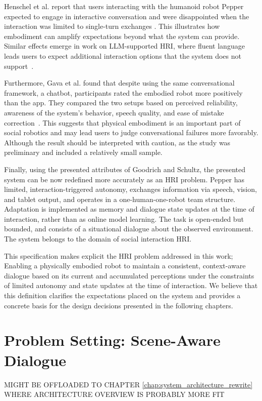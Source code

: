 Henschel et al. report that users interacting with the humanoid robot Pepper expected to engage in interactive conversation and were disappointed when the interaction was limited to single-turn exchanges \cite[12]{henschel_what_2021}. This illustrates how embodiment can amplify expectations beyond what the system can provide. Similar effects emerge in work on LLM-supported HRI, where fluent language leads users to expect additional interaction options that the system does not support~\cite{kim_understanding_2024}.

Furthermore, Gava et al. found that despite using the same conversational framework, a chatbot, participants rated the embodied robot more positively than the app. They compared the two setups based on perceived reliability, awareness of the system's behavior, speech quality, and ease of mistake correction~\cite{gava2024physical}. This suggests that physical embodiment is an important part of social robotics and may lead users to judge conversational failures more favorably. Although the result should be interpreted with caution, as the study was preliminary and included a relatively small sample.


Finally, using the presented attributes of Goodrich and Schultz, the presented system can be now redefined more accurately as an HRI problem. Pepper has limited, interaction-triggered autonomy, exchanges information via speech, vision, and tablet output, and operates in a one-human-one-robot team structure. Adaptation is implemented as memory and dialogue state updates at the time of interaction, rather than as online model learning. The task is open-ended but bounded, and consists of a situational dialogue about the observed environment. The system belongs to the domain of social interaction HRI.

This specification makes explicit the HRI problem addressed in this work; Enabling a physically embodied robot to maintain a consistent, context-aware dialogue based on its current and accumulated perceptions under the constraints of limited autonomy and state updates at the time of interaction. We believe that this definition clarifies the expectations placed on the system and provides a concrete basis for the design decisions presented in the following chapters.

\section{Problem Setting: Scene-Aware Dialogue}\label{sec:problem-setting-scene-aware-dialogue}
MIGHT BE OFFLOADED TO CHAPTER \ref{chap:system_architecture_rewrite} WHERE ARCHITECTURE OVERVIEW IS PROBABLY MORE FIT


